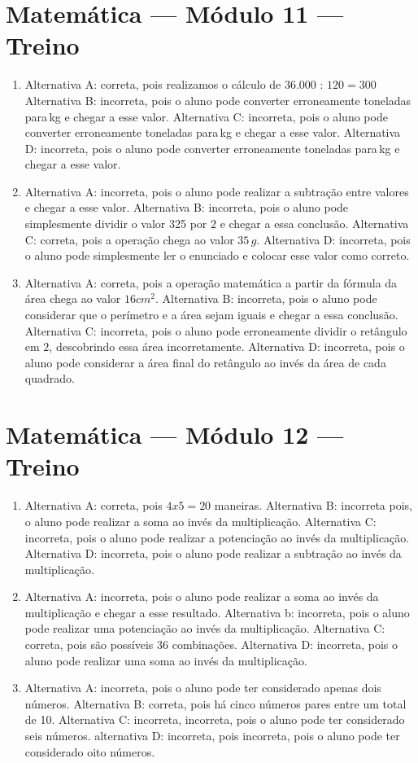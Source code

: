 \section*{Matemática — Módulo 11 — Treino}

\begin{enumerate}

\item Alternativa A: correta, pois realizamos o cálculo de $36.000$ : $120 = 300$
Alternativa B: incorreta, pois o aluno pode converter erroneamente
toneladas para\,kg e chegar a esse valor.
Alternativa C: incorreta, pois o aluno pode converter erroneamente
toneladas para\,kg e chegar a esse valor.
Alternativa D: incorreta, pois o aluno pode converter erroneamente
toneladas para\,kg e chegar a esse valor.
\item Alternativa A: incorreta, pois o aluno pode realizar a subtração entre
valores e chegar a esse valor.
Alternativa B: incorreta, pois o aluno pode simplesmente dividir o valor
325 por $2$ e chegar a essa conclusão.
Alternativa C: correta, pois a operação chega ao valor $35\,g$.
Alternativa D: incorreta, pois o aluno pode simplesmente ler o enunciado
e colocar esse valor como correto.
\item Alternativa A: correta, pois a operação matemática a partir da fórmula
da área chega ao valor $16cm^2$.
Alternativa B: incorreta, pois o aluno pode considerar que o perímetro e
a área sejam iguais e chegar a essa conclusão.
Alternativa C: incorreta, pois o aluno pode erroneamente dividir o
retângulo em $2$, descobrindo essa área incorretamente.
Alternativa D: incorreta, pois o aluno pode considerar a área final do
retângulo ao invés da área de cada quadrado.
\end{enumerate}

\section*{Matemática — Módulo 12 — Treino}

\begin{enumerate}
\item Alternativa A: correta, pois $4 x 5 = 20$ maneiras.
Alternativa B: incorreta pois, o aluno pode realizar a soma ao invés da
multiplicação.
Alternativa C: incorreta, pois o aluno pode realizar a potenciação ao
invés da multiplicação.
Alternativa D: incorreta, pois o aluno pode realizar a subtração ao
invés da multiplicação.
\item Alternativa A: incorreta, pois o aluno pode realizar a soma ao invés da
multiplicação e chegar a esse resultado.
Alternativa b: incorreta, pois o aluno pode realizar uma potenciação ao
invés da multiplicação. 
Alternativa C: correta, pois são possíveis $36$ combinações.
Alternativa D: incorreta, pois o aluno pode realizar uma soma ao invés
da multiplicação.
\item Alternativa A: incorreta, pois o aluno pode ter considerado apenas dois
números.
Alternativa B: correta, pois há cinco números pares entre um total de
10.
Alternativa C: incorreta, incorreta, pois o aluno pode ter considerado
seis números.
alternativa D: incorreta, pois incorreta, pois o aluno pode ter
considerado oito números.
\end{enumerate}

